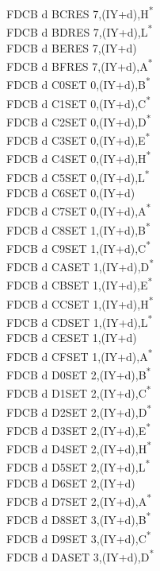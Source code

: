 \documentclass[oneside,a4paper]{book}
\begin{document}
\begin{multicols}{3}
{\begin{tabbing}
FDCB d BC\>RES 7,(IY+d),H\textsuperscript{*}\\
FDCB d BD\>RES 7,(IY+d),L\textsuperscript{*}\\
FDCB d BE\>RES 7,(IY+d)\\
FDCB d BF\>RES 7,(IY+d),A\textsuperscript{*}\\
FDCB d C0\>SET 0,(IY+d),B\textsuperscript{*}\\
FDCB d C1\>SET 0,(IY+d),C\textsuperscript{*}\\
FDCB d C2\>SET 0,(IY+d),D\textsuperscript{*}\\
FDCB d C3\>SET 0,(IY+d),E\textsuperscript{*}\\
FDCB d C4\>SET 0,(IY+d),H\textsuperscript{*}\\
FDCB d C5\>SET 0,(IY+d),L\textsuperscript{*}\\
FDCB d C6\>SET 0,(IY+d)\\
FDCB d C7\>SET 0,(IY+d),A\textsuperscript{*}\\
FDCB d C8\>SET 1,(IY+d),B\textsuperscript{*}\\
FDCB d C9\>SET 1,(IY+d),C\textsuperscript{*}\\
FDCB d CA\>SET 1,(IY+d),D\textsuperscript{*}\\
FDCB d CB\>SET 1,(IY+d),E\textsuperscript{*}\\
FDCB d CC\>SET 1,(IY+d),H\textsuperscript{*}\\
FDCB d CD\>SET 1,(IY+d),L\textsuperscript{*}\\
FDCB d CE\>SET 1,(IY+d)\\
FDCB d CF\>SET 1,(IY+d),A\textsuperscript{*}\\
FDCB d D0\>SET 2,(IY+d),B\textsuperscript{*}\\
FDCB d D1\>SET 2,(IY+d),C\textsuperscript{*}\\
FDCB d D2\>SET 2,(IY+d),D\textsuperscript{*}\\
FDCB d D3\>SET 2,(IY+d),E\textsuperscript{*}\\
FDCB d D4\>SET 2,(IY+d),H\textsuperscript{*}\\
FDCB d D5\>SET 2,(IY+d),L\textsuperscript{*}\\
FDCB d D6\>SET 2,(IY+d)\\
FDCB d D7\>SET 2,(IY+d),A\textsuperscript{*}\\
FDCB d D8\>SET 3,(IY+d),B\textsuperscript{*}\\
FDCB d D9\>SET 3,(IY+d),C\textsuperscript{*}\\
FDCB d DA\>SET 3,(IY+d),D\textsuperscript{*}\\

\end{tabbing}}
\end{multicols}
\end{document}

